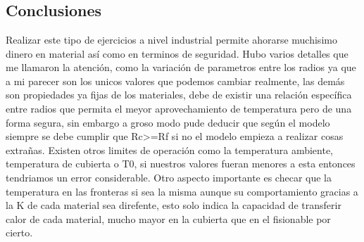 \documentclass[11pt]{article}
\begin{document}
    \begin{center}
    \end{center}
    { \hspace*{\fill} \\}
    
    \begin{center}
    \end{center}
    { \hspace*{\fill} \\}
    
    \begin{center}
    \end{center}
    { \hspace*{\fill} \\}
    
    \hypertarget{conclusiones}{%
\subsection{Conclusiones}\label{conclusiones}}

Realizar este tipo de ejercicios a nivel industrial permite ahorarse
muchisimo dinero en material así como en terminos de seguridad. Hubo
varios detalles que me llamaron la atención, como la variación de
parametros entre los radios ya que a mi parecer son los unicos valores
que podemos cambiar realmente, las demás son propiedades ya fijas de los
materiales, debe de existir una relación específica entre radios que
permita el meyor aprovechamiento de temperatura pero de una forma
segura, sin embargo a groso modo pude deducir que según el modelo
siempre se debe cumplir que Rc\textgreater{}=Rf si no el modelo empieza
a realizar cosas extrañas. Existen otros limites de operación como la
temperatura ambiente, temperatura de cubierta o T0, si nuestros valores
fueran menores a esta entonces tendriamos un error considerable. 
Otro aspecto importante es checar que la temperatura en las fronteras si
sea la misma aunque su comportamiento gracias a la K de cada material
sea direfente, esto solo indica la capacidad de transferir calor de cada
material, mucho mayor en la cubierta que en el fisionable por cierto.



    
    
    
    
\end{document}
